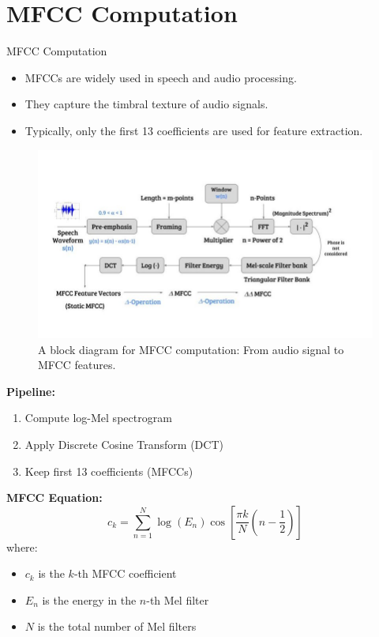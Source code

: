 \section{MFCC Computation}

\begin{frame}{MFCC Computation}
    \begin{itemize}
    \item MFCCs are widely used in speech and audio processing.
    \item They capture the timbral texture of audio signals.
    \item Typically, only the first 13 coefficients are used for feature extraction.
\end{itemize}
\framebreak
\begin{figure}
    \centering
    \includegraphics[width=1.08\textwidth,height=0.8\textheight,keepaspectratio]{images/audio-nlp/mfcc.png}
    \caption*{A block diagram for MFCC computation: From audio signal to MFCC features.}
\end{figure}
\framebreak
\textbf{Pipeline:}
\begin{enumerate}
    \item Compute log-Mel spectrogram
    \item Apply Discrete Cosine Transform (DCT)
    \item Keep first 13 coefficients (MFCCs)
\end{enumerate}

\textbf{MFCC Equation:}
\begin{equation}
    c_k = \sum_{n=1}^{N} \log(E_n) \cos\left[ \frac{\pi k}{N} \left( n - \frac{1}{2} \right) \right]
\end{equation}
where:
\begin{itemize}
    \item $c_k$ is the $k$-th MFCC coefficient
    \item $E_n$ is the energy in the $n$-th Mel filter
    \item $N$ is the total number of Mel filters
\end{itemize}
\end{frame}